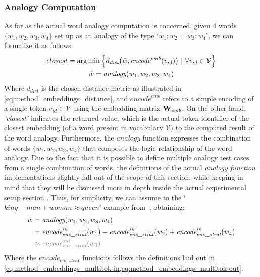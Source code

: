 
\subsubsection{Analogy Computation}

As far as the actual word analogy computation is concerned, given 4 words $\{w_1, w_2, w_3, w_4\}$ set up as an analogy of the type `$w_1 : w_2 = w_3 : w_4$', we can formalize it as follows:
\begin{equation}
    \label{eq:method_embeddings_analogy}
    \begin{gathered}
        closest = \arg\min {\Bigl\{ d_{\textit{dist}}\bigl(\tilde w, \textit{encode}^{\textit{emb}}(v_{id})\bigr) \ |\ \forall v_{id} \in \mathcal{V} \Bigr\}} \\
        \tilde w = \textit{analogy}(w_1, w_2, w_3, w_4)
    \end{gathered}
\end{equation}
Where $d_{\textit{dist}}$ is the chosen distance metric as illustrated in \cref{eq:method_embeddings_distance}, and $\textit{encode}^{\textit{emb}}$ refers to a simple encoding of a single token $v_{id} \in \mathcal{V}$ using the embedding matrix $\bm{\mathbf{W}}_{\textit{emb}}$.
On the other hand, \emph{`closest'} indicates the returned value, which is the actual token identifier of the closest embedding (of a word present in vocabulary $\mathcal{V}$) to the computed result of the word analogy.
Furthermore, the $\textit{analogy}$ function expresses the combination of words $\{w_1, w_2, w_3, w_4\}$ that composes the logic relationship of the word analogy.
Due to the fact that it is possible to define multiple analogy test cases from a single combination of words, the definitions of the actual \emph{analogy function} implementations slightly fall out of the scope of this section, while keeping in mind that they will be discussed more in depth inside the actual experimental setup section .
Thus, for simplicity, we can assume to  the  `$king - man + woman \approx queen$' example from~\citet{mikolov2013}, obtaining:
\begin{equation}
    \label{eq:method_embeddings_analogy-function}
    \begin{aligned}
        \tilde w &= \textit{analogy}(w_1, w_2, w_3, w_4) \\
        &= {\textit{encode}}_{\textit{enc\_strat}}^{in}(w_1) - {\textit{encode}}_{\textit{enc\_strat}}^{in}(w_2) + {\textit{encode}}_{\textit{enc\_strat}}^{in}(w_4) \\
        &\color{gray} \approx {\textit{encode}}_{\textit{enc\_strat}}^{out}(w_3) 
    \end{aligned}
\end{equation}
Where the ${\textit{encode}}_{\textit{enc\_strat}}$ functions follows the definitions laid out in \cref{eq:method_embeddings_multitok-in,eq:method_embeddings_multitok-out}.

